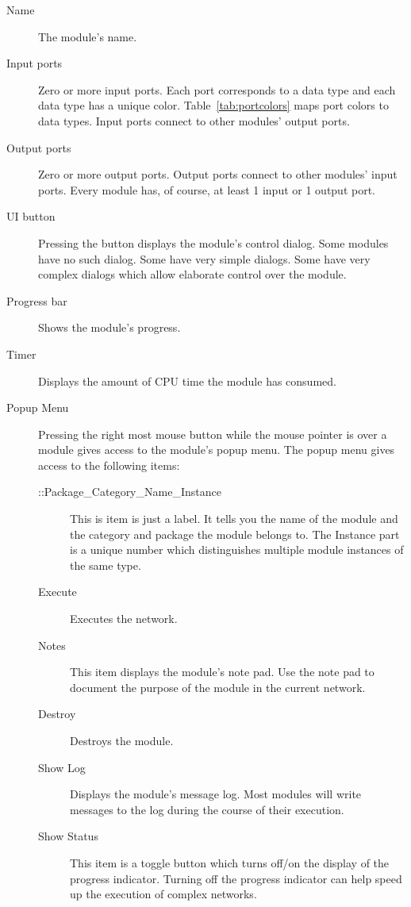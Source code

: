 \begin{description}
\item[Name] The module's name.
\item[Input ports] Zero or more input ports.  Each port corresponds to a
  data type and each data type has a unique color.
  Table~\ref{tab:portcolors} maps port colors to data types.  Input ports
  connect to other modules' output ports.
\item[Output ports] Zero or more output ports.  Output ports connect to
  other modules' input ports.  Every module has, of course, at least 1 input
  or 1 output port.
\item[UI button] Pressing the  button displays the module's
  control dialog. Some modules have no such dialog. Some have very
  simple dialogs.  Some have very complex dialogs which allow elaborate
  control over the module.  
\item[Progress bar] Shows the module's progress.
\item[Timer] Displays the amount of CPU time the module has consumed.
\item[Popup Menu] Pressing the right most mouse button while the mouse
  pointer is over a module gives access to the module's popup menu.  The
  popup menu gives access to the following items:
  \begin{description}
  \item[::Package_Category_Name_Instance]  This is item is just a label.
    It tells you the name of the module and the category and package the
    module belongs to.  The Instance part is a unique number which
    distinguishes multiple module instances of the same type.
  \item[Execute] Executes the network.
  \item[Notes] This item displays the module's note pad.  Use the note pad
    to document the purpose of the module in the current network.
  \item[Destroy] Destroys the module.
  \item[Show Log] Displays the module's message log.  Most modules will
    write messages to the log during the course of their execution.
  \item[Show Status] This item is a toggle button which turns off/on the
    display of the progress indicator.  Turning off the progress indicator
    can help speed up the execution of complex networks.
  \end{description}
\end{description}

